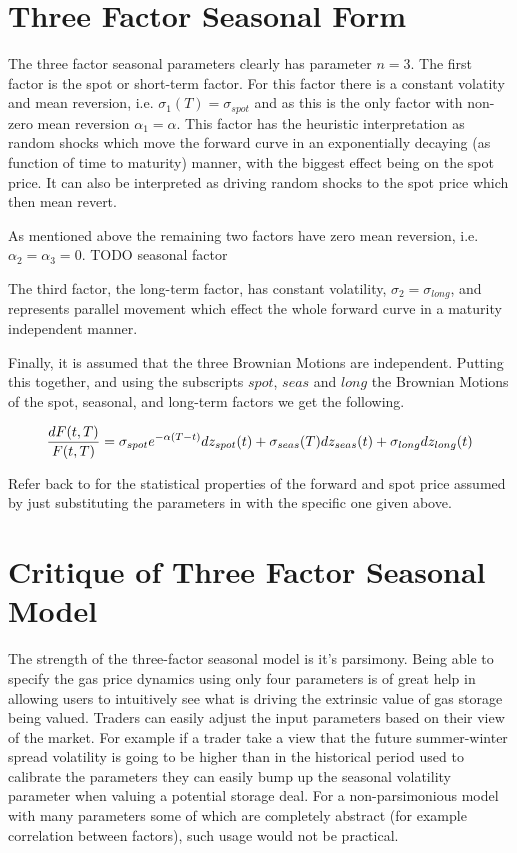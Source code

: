 \documentclass{article}
\begin{document}
\section{Three Factor Seasonal Form}
The three factor seasonal parameters clearly has parameter $n=3$. The first factor is
the spot or short-term factor. For this factor there is a constant volatity and mean
reversion, i.e. $\sigma_1(T) = \sigma_{spot}$ and as this is the only factor with
non-zero mean reversion $\alpha_1 = \alpha$. This factor has the heuristic interpretation
as random shocks which move the forward curve in an exponentially decaying (as function of
time to maturity) manner, with the biggest effect being on the spot price. It can also %
be interpreted as driving random shocks to the spot price which then mean revert.

As mentioned above the remaining two factors have zero mean reversion, i.e. 
$\alpha_2 = \alpha_3 = 0$. TODO seasonal factor 

The third factor, the long-term factor, has constant volatility, $\sigma_2 = \sigma_{long}$,
and represents parallel movement which effect the whole forward curve in a maturity 
independent manner.

Finally, it is assumed that the three Brownian Motions are independent. Putting this 
together, and using the subscripts $spot$, $seas$ and $long$ the Brownian Motions
of the spot, seasonal, and long-term factors we get the following.

\begin{equation}
    \frac{dF(t, T)}{F(t, T)}= \sigma_{spot} e^{-\alpha(T - t)} dz_{spot}(t) + \\
        \sigma_{seas}(T) dz_{seas}(t) + \sigma_{long} dz_{long}(t)
\end{equation}

Refer back to \cite{Fowler} for the statistical properties of the forward and spot
price assumed by just substituting the parameters in \cite{Fowler} with the specific
one given above.

\section{Critique of Three Factor Seasonal Model}
The strength of the three-factor seasonal model is it's parsimony. 
Being able to specify the gas price dynamics using only four parameters is of great help
in allowing users to intuitively see what is driving the extrinsic value of gas storage
being valued. Traders can easily adjust the input
parameters based on their view of the market. For example if a trader take a view that 
the future summer-winter spread volatility is going to be higher than in the historical
period used to calibrate the parameters they can easily bump up the seasonal volatility
parameter when valuing a potential storage deal. For a non-parsimonious model with many parameters
some of which are completely abstract (for example correlation between factors), such
usage would not be practical.
\end{document}
